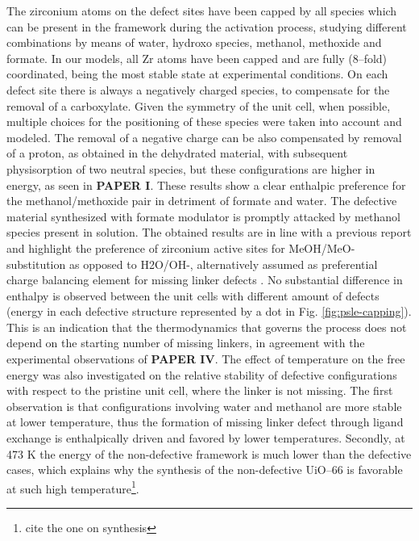 \npar
The zirconium atoms on the defect sites have been capped by all species which can be present in the framework during the activation process, studying different combinations by means of water, hydroxo species, methanol, methoxide and formate. In our models, all Zr atoms have been capped and are fully (8--fold) coordinated, being the most stable state at experimental conditions. On each defect site there is always a negatively charged species, to compensate for the removal of a carboxylate. Given the symmetry of the unit cell, when possible, multiple choices for the positioning of these species were taken into account and modeled. The removal of a negative charge can be also compensated by removal of a proton, as obtained in the dehydrated material, with subsequent physisorption of two neutral species, but these configurations are higher in energy, as seen in \textbf{PAPER I}. These results show a clear enthalpic preference for the methanol/methoxide pair in detriment of formate and water. The defective material synthesized with formate modulator is promptly attacked by methanol species present in solution. The obtained results are in line with a previous report \cite{yang2016tuning} and highlight the preference of zirconium active sites for MeOH/MeO- substitution as opposed to H2O/OH-, alternatively assumed as preferential charge balancing element for missing linker defects \cite{trickett2015definitive, ling2016dynamic}. No substantial difference in enthalpy is observed between the unit cells with different amount of defects (energy in each defective structure represented by a dot in Fig. \ref{fig:psle-capping}). This is an indication that the thermodynamics that governs the process does not depend on the starting number of missing linkers, in agreement with the experimental observations of \textbf{PAPER IV}. The effect of temperature on the free energy was also investigated on the relative stability of defective configurations with respect to the pristine unit cell, where the linker is not missing. The first observation is that configurations involving water and methanol are more stable at lower temperature, thus the formation of missing linker defect through ligand exchange is enthalpically driven and favored by lower temperatures. Secondly, at 473 K the energy of the non-defective framework is much lower than the defective cases, which explains why the synthesis of the non-defective UiO--66 is favorable at such high temperature\footnote{cite the one on synthesis}.

